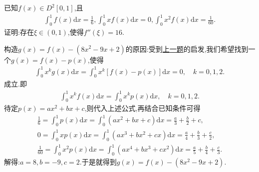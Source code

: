 \documentclass[../../main.tex]{subfiles}
\begin{document}
\begin{example}
已知$f(x)\in D^2[0,1]$,且
\begin{align*}
\int_0^1{f\left( x \right) \mathrm{d}x}=\frac{1}{6},\int_0^1{xf\left( x \right) \mathrm{d}x}=0,\int_0^1{x^2f\left( x \right) \mathrm{d}x}=\frac{1}{60}.
\end{align*}
证明:存在$\xi \in (0,1)$,使得$f''(\xi)=16$.
\end{example}
\begin{note}
构造$g(x)=f(x)-(8x^2 - 9x + 2)$的原因:受到\hyperref[proposition:x^kf积分为0则f至少有n+1个零点]{上一题}的启发,我们希望找到一个$g(x)=f(x)-p(x)$,使得
\begin{align*}
\int_0^1 x^k g(x)\mathrm{d}x =\int_0^1 x^k [f(x)-p(x)]\mathrm{d}x = 0, \quad k = 0,1,2.
\end{align*}
成立.即
\begin{align*}
\int_0^1{x^kf(x)\mathrm{d}x}=\int_0^1{x^kp(x)\mathrm{d}x},\quad k=0,1,2.
\end{align*}
待定$p(x)=ax^2+bx+c$,则代入上述公式,再结合已知条件可得
\begin{gather*}
\frac{1}{6}=\int_0^1{p(x)\mathrm{d}x}=\int_0^1{\left( ax^2+bx+c \right) \mathrm{d}x}=\frac{a}{3}+\frac{b}{2}+c,
\\
0=\int_0^1{xp(x)\mathrm{d}x}=\int_0^1{\left( ax^3+bx^2+cx \right) \mathrm{d}x}=\frac{a}{4}+\frac{b}{3}+\frac{c}{2},
\\
\frac{1}{60}=\int_0^1{x^2p(x)\mathrm{d}x}=\int_0^1{\left( ax^4+bx^3+cx^2 \right) \mathrm{d}x}=\frac{a}{5}+\frac{b}{4}+\frac{c}{3}.
\end{gather*}
解得:$a=8,b=-9,c=2$.于是就得到\(g(x)=f(x)-(8x^2 - 9x + 2)\).
\end{note}
\end{document}
